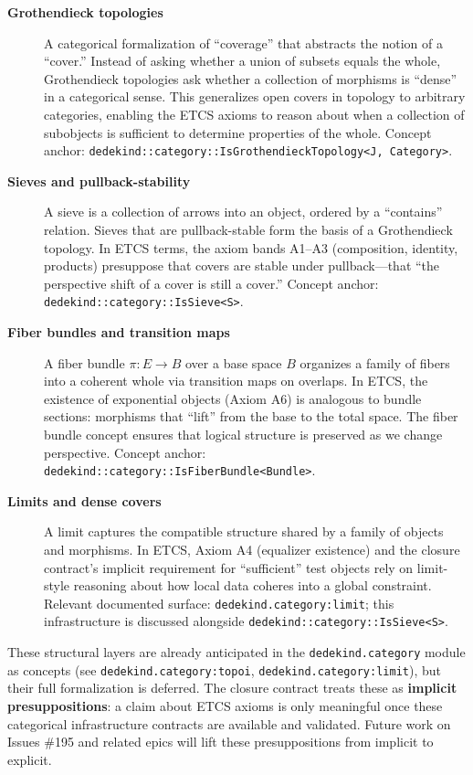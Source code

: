 \documentclass[11pt, a4paper]{report}
\begin{document}
\begin{description}
  \item[\textbf{Grothendieck topologies}] A categorical formalization of ``coverage'' that abstracts the notion of a ``cover.'' Instead of asking whether a union of subsets equals the whole, Grothendieck topologies ask whether a collection of morphisms is ``dense'' in a categorical sense. This generalizes open covers in topology to arbitrary categories, enabling the ETCS axioms to reason about when a collection of subobjects is sufficient to determine properties of the whole. Concept anchor: \texttt{dedekind::category::IsGrothendieckTopology<J, Category>}.
  \item[\textbf{Sieves and pullback-stability}] A sieve is a collection of arrows into an object, ordered by a ``contains'' relation. Sieves that are pullback-stable form the basis of a Grothendieck topology. In ETCS terms, the axiom bands A1--A3 (composition, identity, products) presuppose that covers are stable under pullback---that ``the perspective shift of a cover is still a cover.'' Concept anchor: \texttt{dedekind::category::IsSieve<S>}.
  \item[\textbf{Fiber bundles and transition maps}] A fiber bundle $\pi : E \to B$ over a base space $B$ organizes a family of fibers into a coherent whole via transition maps on overlaps. In ETCS, the existence of exponential objects (Axiom A6) is analogous to bundle sections: morphisms that ``lift'' from the base to the total space. The fiber bundle concept ensures that logical structure is preserved as we change perspective. Concept anchor: \texttt{dedekind::category::IsFiberBundle<Bundle>}.
  \item[\textbf{Limits and dense covers}] A limit captures the compatible structure shared by a family of objects and morphisms. In ETCS, Axiom A4 (equalizer existence) and the closure contract's implicit requirement for ``sufficient'' test objects rely on limit-style reasoning about how local data coheres into a global constraint. Relevant documented surface: \texttt{dedekind.category:limit}; this infrastructure is discussed alongside \texttt{dedekind::category::IsSieve<S>}.
\end{description}

These structural layers are already anticipated in the \texttt{dedekind.category} module as concepts (see \texttt{dedekind.category:topoi}, \texttt{dedekind.category:limit}), but their full formalization is deferred. The closure contract treats these as \textbf{implicit presuppositions}: a claim about ETCS axioms is only meaningful once these categorical infrastructure contracts are available and validated. Future work on Issues \#195 and related epics will lift these presuppositions from implicit to explicit.
\end{document}
